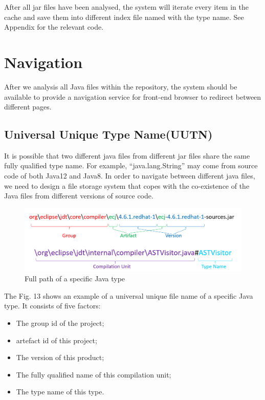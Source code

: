 \documentclass[runningheads]{llncs}
\begin{document}
After all jar files have been analysed, the system will iterate every item in the cache and save them into different index file named with the type name. See Appendix for the relevant code.

\section{Navigation}

After we analysis all Java files within the repository, the system should be available to provide a navigation service for front-end browser to redirect between different pages.

\subsection{Universal Unique Type Name(UUTN)}
It is possible that two different java files from different jar files share the same fully qualified type name. For example, “java.lang.String” may come from source code of both Java12 and Java8. In order to navigate between different java files, we need to design a file storage system that copes with the co-existence of the Java files from different versions of source code.

\begin{figure}[H]
	\centering
	\includegraphics[width=12cm]{pic/GavCuSample.png}
	\caption{Full path of a specific Java type}
	\label{Full path of a specific Java type}
\end{figure}

The Fig. 13 shows an example of a universal unique file name of a specific Java type. It consists of five factors:

\begin{itemize}
	\item The group id of the project;
	\item artefact id of this project;
	\item The version of this product;
	\item The fully qualified name of this compilation unit;
	\item The type name of this type.
\end{itemize}
\end{document}
